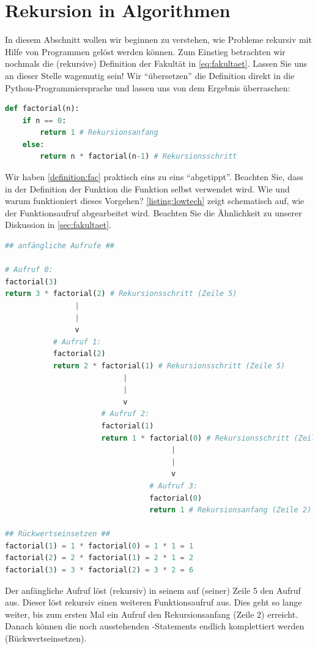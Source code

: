 \section{Rekursion in Algorithmen}
In diesem Abschnitt wollen wir beginnen zu verstehen, wie Probleme rekursiv mit Hilfe von Programmen gelöst werden können. Zum Einstieg betrachten wir nochmals die (rekursive) Definition der Fakultät in \cref{eq:fakultaet}. Lassen Sie uns an dieser Stelle wagemutig sein! Wir \enquote{übersetzen} die Definition direkt in die Python-Programmiersprache und lassen uns von dem Ergebnis überraschen:
\begin{lstlisting}[language=Python,caption=rekursive Fakultäts-Funktion]
def factorial(n):
    if n == 0:
        return 1 # Rekursionsanfang
    else:
        return n * factorial(n-1) # Rekursionsschritt
\end{lstlisting}
Wir haben \cref{definition:fac} praktisch eins zu eins \enquote{abgetippt}. Beachten Sie, dass in der Definition der Funktion  die Funktion  selbst verwendet wird. Wie und warum funktioniert dieses Vorgehen? \cref{listing:lowtech} zeigt schematisch auf, wie der Funktionsaufruf  abgearbeitet wird. Beachten Sie die Ähnlichkeit zu unserer Diskussion in \cref{sec:fakultaet}. 

\lstset{basicstyle=\ttfamily\footnotesize}
\begin{lstlisting}[language=Python,caption=rekursive Berechnung der Fakultät,label=listing:lowtech]
## anfängliche Aufrufe ##

# Aufruf 0:
factorial(3)
return 3 * factorial(2) # Rekursionsschritt (Zeile 5)
                |
                |
                v 
           # Aufruf 1:
           factorial(2)
           return 2 * factorial(1) # Rekursionsschritt (Zeile 5)
                           |
                           |
                           v
                      # Aufruf 2:
                      factorial(1)
                      return 1 * factorial(0) # Rekursionsschritt (Zeile 5)
                                      |
                                      |
                                      v
                                 # Aufruf 3:
                                 factorial(0)
                                 return 1 # Rekursionsanfang (Zeile 2)

## Rückwertseinsetzen ##
factorial(1) = 1 * factorial(0) = 1 * 1 = 1
factorial(2) = 2 * factorial(1) = 2 * 1 = 2
factorial(3) = 3 * factorial(2) = 3 * 2 = 6
\end{lstlisting}
\lstset{style=mystyle}
\noindent
Der anfängliche Aufruf  löst (rekursiv) in seinem  auf (seiner) Zeile 5 den Aufruf  aus. Dieser löst rekursiv einen weiteren Funktionsaufruf aus. Dies geht so lange weiter, bis zum ersten Mal ein Aufruf den Rekursionsanfang (Zeile 2) erreicht. Danach können die noch ausstehenden -Statements endlich komplettiert werden (Rückwertseinsetzen).

